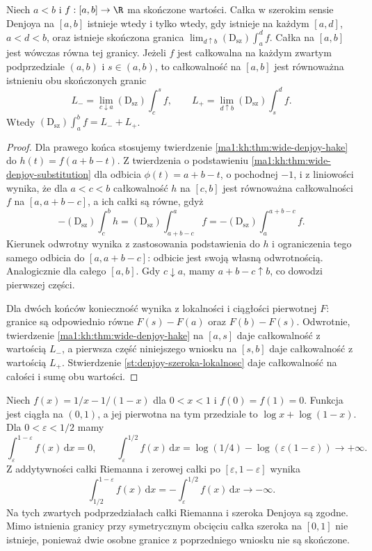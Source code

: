 \begin{wniosek}
\label{it:cor:wide-denjoy-hake-two-endpoints}
Niech $a<b$ i $f:[a,b]\to\R$ ma skończone wartości.
Całka w szerokim sensie Denjoya na $[a,b]$ istnieje wtedy
i tylko wtedy, gdy istnieje na każdym $[a,d]$, $a<d<b$,
oraz istnieje skończona granica
$\lim_{d\uparrow b}(\mathrm D_{\mathrm{sz}})\int_a^d f$.
Całka na $[a,b]$ jest wówczas równa tej granicy.
Jeżeli $f$ jest całkowalna na każdym zwartym podprzedziale
$(a,b)$ i $s\in(a,b)$, to całkowalność na $[a,b]$
jest równoważna istnieniu obu skończonych granic
\[
 L_-=\lim_{c\downarrow a}(\mathrm D_{\mathrm{sz}})\int_c^s f,
 \qquad
 L_+=\lim_{d\uparrow b}(\mathrm D_{\mathrm{sz}})\int_s^d f.
\]
Wtedy $(\mathrm D_{\mathrm{sz}})\int_a^b f=L_-+L_+$.
\end{wniosek}
\begin{proof}
Dla prawego końca stosujemy twierdzenie
\ref{ma1:kh:thm:wide-denjoy-hake} do $h(t)=f(a+b-t)$.
Z twierdzenia o podstawieniu
\ref{ma1:kh:thm:wide-denjoy-substitution} dla odbicia
$\phi(t)=a+b-t$, o pochodnej $-1$, i z liniowości
wynika, że dla $a<c<b$ całkowalność $h$ na $[c,b]$
jest równoważna całkowalności $f$ na $[a,a+b-c]$,
a ich całki są równe, gdyż
\[
 -(\mathrm D_{\mathrm{sz}})\int_c^b h
 =(\mathrm D_{\mathrm{sz}})\int_{a+b-c}^{a} f
 =-(\mathrm D_{\mathrm{sz}})\int_a^{a+b-c} f.
\]
Kierunek odwrotny wynika z zastosowania podstawienia
do $h$ i ograniczenia tego samego odbicia do
$[a,a+b-c]$: odbicie jest swoją własną odwrotnością.
Analogicznie dla całego $[a,b]$.
Gdy $c\downarrow a$, mamy $a+b-c\uparrow b$,
co dowodzi pierwszej części.

Dla dwóch końców konieczność wynika z lokalności
i ciągłości pierwotnej $F$: granice są odpowiednio
równe $F(s)-F(a)$ oraz $F(b)-F(s)$.
Odwrotnie, twierdzenie \ref{ma1:kh:thm:wide-denjoy-hake}
na $[a,s]$ daje całkowalność z wartością $L_-$,
a pierwsza część niniejszego wniosku na $[s,b]$
daje całkowalność z wartością $L_+$.
Stwierdzenie \ref{st:denjoy-szeroka-lokalnosc}
daje całkowalność na całości i sumę obu wartości.
\end{proof}
\begin{uwaga}
Niech $f(x)=1/x-1/(1-x)$ dla $0<x<1$ i $f(0)=f(1)=0$.
Funkcja jest ciągła na $(0,1)$, a jej pierwotna na
tym przedziale to $\log x+\log(1-x)$.
Dla $0<\varepsilon<1/2$ mamy
\[
 \int_\varepsilon^{1-\varepsilon} f(x)\,\mathrm dx=0,
 \qquad
 \int_\varepsilon^{1/2}f(x)\,\mathrm dx
 =\log(1/4)-\log(\varepsilon(1-\varepsilon))
 \longrightarrow+\infty.
\]
Z addytywności całki Riemanna i zerowej całki
po $[\varepsilon,1-\varepsilon]$ wynika
\[
 \int_{1/2}^{1-\varepsilon}f(x)\,\mathrm dx
 =-\int_\varepsilon^{1/2}f(x)\,\mathrm dx
 \longrightarrow-\infty.
\]
Na tych zwartych podprzedziałach całki Riemanna
i szeroka Denjoya są zgodne.
Mimo istnienia granicy przy symetrycznym obcięciu
całka szeroka na $[0,1]$ nie istnieje, ponieważ
dwie osobne granice z poprzedniego wniosku nie są skończone.
\end{uwaga}

